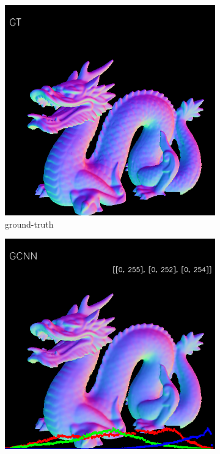 \begin{figure}[h!]
\begin{subfigure}[b]{0.24\linewidth}
		\includegraphics[width=\linewidth]{./Figures/gcnn-synthetic/fancy_eval_3_groundtruth.png}
		\caption{ground-truth}
	\end{subfigure}
	\begin{subfigure}[b]{0.24\linewidth}
		\includegraphics[width=\linewidth]{./Figures/gcnn-synthetic/fancy_eval_3_normal_GCNN.png}

\end{subfigure}
\end{figure}
